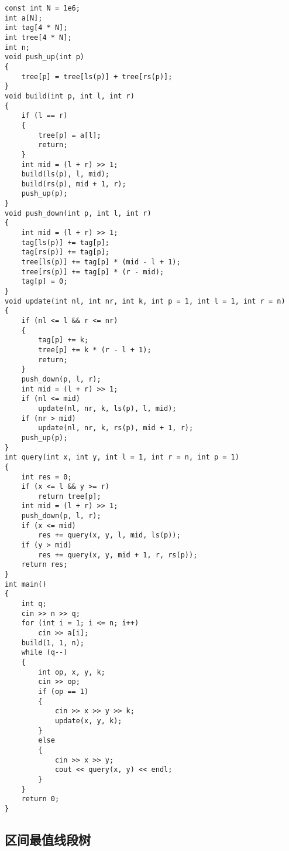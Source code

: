 \documentclass[]{article}
\begin{document}
\begin{verbatim}
const int N = 1e6;
int a[N];
int tag[4 * N];
int tree[4 * N];
int n;
void push_up(int p)
{
    tree[p] = tree[ls(p)] + tree[rs(p)];
}
void build(int p, int l, int r)
{
    if (l == r)
    {
        tree[p] = a[l];
        return;
    }
    int mid = (l + r) >> 1;
    build(ls(p), l, mid);
    build(rs(p), mid + 1, r);
    push_up(p);
}
void push_down(int p, int l, int r)
{
    int mid = (l + r) >> 1;
    tag[ls(p)] += tag[p];
    tag[rs(p)] += tag[p];
    tree[ls(p)] += tag[p] * (mid - l + 1);
    tree[rs(p)] += tag[p] * (r - mid);
    tag[p] = 0;
}
void update(int nl, int nr, int k, int p = 1, int l = 1, int r = n)
{
    if (nl <= l && r <= nr)
    {
        tag[p] += k;
        tree[p] += k * (r - l + 1);
        return;
    }
    push_down(p, l, r);
    int mid = (l + r) >> 1;
    if (nl <= mid)
        update(nl, nr, k, ls(p), l, mid);
    if (nr > mid)
        update(nl, nr, k, rs(p), mid + 1, r);
    push_up(p);
}
int query(int x, int y, int l = 1, int r = n, int p = 1)
{
    int res = 0;
    if (x <= l && y >= r)
        return tree[p];
    int mid = (l + r) >> 1;
    push_down(p, l, r);
    if (x <= mid)
        res += query(x, y, l, mid, ls(p));
    if (y > mid)
        res += query(x, y, mid + 1, r, rs(p));
    return res;
}
int main()
{
    int q;
    cin >> n >> q;
    for (int i = 1; i <= n; i++)
        cin >> a[i];
    build(1, 1, n);
    while (q--)
    {
        int op, x, y, k;
        cin >> op;
        if (op == 1)
        {
            cin >> x >> y >> k;
            update(x, y, k);
        }
        else
        {
            cin >> x >> y;
            cout << query(x, y) << endl;
        }
    }
    return 0;
}
\end{verbatim}

\hypertarget{ux533aux95f4ux6700ux503cux7ebfux6bb5ux6811}{%
\subsection{区间最值线段树}\label{ux533aux95f4ux6700ux503cux7ebfux6bb5ux6811}}
\end{document}
